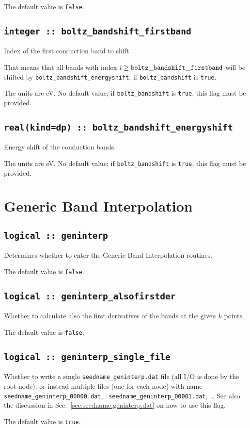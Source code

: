 The default value is \verb#false#.

\subsection[boltz\_bandshift\_firstband]{\tt integer :: boltz\_bandshift\_firstband}
Index of the first conduction band to shift.

That means that all bands with index $i\ge {\tt boltz\_bandshift\_firstband}$ will be shifted by  {\tt boltz\_bandshift\_energyshift}, if {\tt boltz\_bandshift} is \verb#true#.

The units are eV.
No default value; if {\tt boltz\_bandshift} is \verb#true#, this flag must be provided.

\subsection[boltz\_bandshift\_energyshift]{\tt real(kind=dp) :: boltz\_bandshift\_energyshift}
Energy shift of the conduction bands.

The units are eV.
No default value; if {\tt boltz\_bandshift} is \verb#true#, this flag must be provided.


\section{Generic Band Interpolation}
\subsection[boltzwann]{\tt logical :: geninterp}
Determines whether to enter the Generic Band Interpolation routines.

The default value is \verb#false#.

\subsection[geninterp\_alsofirstder]{\tt logical :: geninterp\_alsofirstder}
Whether to calculate also the first derivatives of the bands at the
given $k$ points.

The default value is \verb#false#.

\subsection[geninterp\_alsofirstder]{\tt logical :: geninterp\_single\_file}
Whether to write a single  {\tt seedname\_geninterp.dat} file (all I/O is done by the root node); or
instead multiple files (one for each node) with
name {\tt seedname\_geninterp\_00000.dat}, {\tt
  seedname\_geninterp\_00001.dat}, \ldots
See also the discussion in Sec.~\ref{sec:seedname.geninterp.dat} on
how to use this flag.

The default value is \verb#true#.
